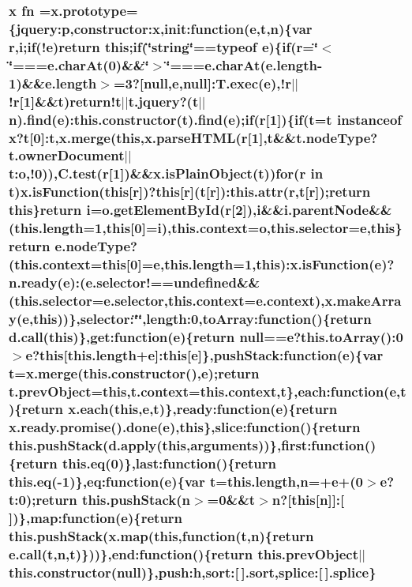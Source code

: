 \hypertarget{jquery-2_80_83_8min_8js_af453dd93808e2e2826fd92ab8c394cfc}{
\subsubsection[{fn}]{\setlength{\rightskip}{0pt plus 5cm}x fn ={\bf x.\-prototype}=\{jquery\-:p,constructor\-:x,init\-:function({\bf e},{\bf t},n)\{var r,i;if(!{\bf e})return this;if(\char`\"{}string\char`\"{}==typeof {\bf e})\{if(r=\char`\"{}$<$\char`\"{}===e.\-char\-At(0)\&\&\char`\"{}$>$\char`\"{}===e.\-char\-At(e.\-length-\/1)\&\&e.\-length$>$=3?\mbox{[}null,{\bf e},null\mbox{]}\-:T.\-exec({\bf e}),!r$\vert$$\vert$!r\mbox{[}1\mbox{]}\&\&{\bf t})return!t$\vert$$\vert$t.\-jquery?({\bf t}$\vert$$\vert$n).find({\bf e})\-:this.\-constructor({\bf t}).find({\bf e});if(r\mbox{[}1\mbox{]})\{if({\bf t}={\bf t} instanceof x?{\bf t}\mbox{[}0\mbox{]}\-:{\bf t},x.\-merge(this,x.\-parse\-H\-T\-M\-L(r\mbox{[}1\mbox{]},{\bf t}\&\&t.\-node\-Type?t.\-owner\-Document$\vert$$\vert$t\-:o,!0)),C.\-test(r\mbox{[}1\mbox{]})\&\&x.\-is\-Plain\-Object({\bf t}))for(r in {\bf t})x.\-is\-Function(this\mbox{[}r\mbox{]})?this\mbox{[}r\mbox{]}({\bf t}\mbox{[}r\mbox{]})\-:this.\-attr(r,{\bf t}\mbox{[}r\mbox{]});return this\}return i=o.\-get\-Element\-By\-Id(r\mbox{[}2\mbox{]}),i\&\&i.\-parent\-Node\&\&(this.\-length=1,this\mbox{[}0\mbox{]}=i),this.\-context=o,this.\-selector={\bf e},this\}return e.\-node\-Type?(this.\-context=this\mbox{[}0\mbox{]}={\bf e},this.\-length=1,this)\-:x.\-is\-Function({\bf e})?{\bf n.\-ready}({\bf e})\-:(e.\-selector!=={\bf undefined}\&\&(this.\-selector=e.\-selector,this.\-context=e.\-context),x.\-make\-Array({\bf e},this))\},selector\-:\char`\"{}\char`\"{},length\-:0,to\-Array\-:function()\{return d.\-call(this)\},get\-:function({\bf e})\{return null=={\bf e}?this.\-to\-Array()\-:0$>${\bf e}?this\mbox{[}this.\-length+{\bf e}\mbox{]}\-:this\mbox{[}{\bf e}\mbox{]}\},push\-Stack\-:function({\bf e})\{var {\bf t}=x.\-merge(this.\-constructor(),{\bf e});return t.\-prev\-Object=this,t.\-context=this.\-context,{\bf t}\},each\-:function({\bf e},{\bf t})\{return {\bf x.\-each}(this,{\bf e},{\bf t})\},ready\-:function({\bf e})\{return {\bf x.\-ready.\-promise}().done({\bf e}),this\},slice\-:function()\{return this.\-push\-Stack(d.\-apply(this,arguments))\},first\-:function()\{return this.\-eq(0)\},last\-:function()\{return this.\-eq(-\/1)\},eq\-:function({\bf e})\{var {\bf t}=this.\-length,n=+{\bf e}+(0$>${\bf e}?t\-:0);return this.\-push\-Stack(n$>$=0\&\&{\bf t}$>$n?\mbox{[}this\mbox{[}n\mbox{]}\mbox{]}\-:\mbox{[}$\,$\mbox{]})\},map\-:function({\bf e})\{return this.\-push\-Stack(x.\-map(this,function({\bf t},n)\{return e.\-call({\bf t},n,{\bf t})\}))\},end\-:function()\{return this.\-prev\-Object$\vert$$\vert$this.\-constructor(null)\},push\-:h,sort\-:\mbox{[}$\,$\mbox{]}.sort,splice\-:\mbox{[}$\,$\mbox{]}.splice\}}}\label{jquery-2_80_83_8min_8js_af453dd93808e2e2826fd92ab8c394cfc}
